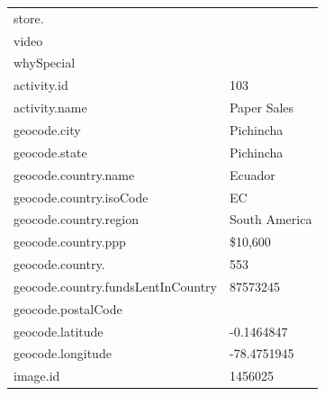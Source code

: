 \begin{longtable}{|p{}|p{}|}
	store.                                                                                                                \\
	video                                           &                                                                     \\
	whySpecial                                      &                                                                     \\
	activity.id                                     & 103                                                                 \\
	activity.name                                   & Paper Sales                                                         \\
	geocode.city                                    & Pichincha                                                           \\
	geocode.state                                   & Pichincha                                                           \\
	geocode.country.name                            & Ecuador                                                             \\
	geocode.country.isoCode                         & EC                                                                  \\
	geocode.country.region                          & South America                                                       \\
	geocode.country.ppp                             & \$10,600                                                            \\
	geocode.country.\densetext{numLoansFundraising} & 553                                                                 \\
	geocode.country.fundsLentInCountry              & 87573245                                                            \\
	geocode.postalCode                              &                                                                     \\
	geocode.latitude                                & -0.1464847                                                          \\
	geocode.longitude                               & -78.4751945                                                         \\
	image.id                                        & 1456025                                                             \\

\end{longtable}
